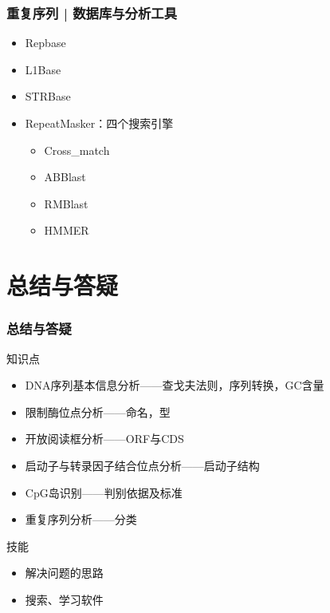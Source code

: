 \begin{frame}
	\frametitle{重复序列 | 数据库与分析工具}
	\begin{itemize}
		\item Repbase
		\item L1Base
		\item STRBase
		\item RepeatMasker：四个搜索引擎
			\begin{itemize}
				\item Cross\_match
				\item ABBlast
				\item RMBlast
				\item HMMER
			\end{itemize}
	\end{itemize}
\end{frame}

\section{总结与答疑}
\begin{frame}
	\frametitle{总结与答疑}
	\begin{block}{知识点}
		\begin{itemize}
			\item DNA序列基本信息分析——查戈夫法则，序列转换，GC含量
			\item 限制酶位点分析——命名，型
			\item 开放阅读框分析——ORF与CDS
			\item 启动子与转录因子结合位点分析——启动子结构
			\item CpG岛识别——判别依据及标准
			\item 重复序列分析——分类
		\end{itemize}
	\end{block}
	\begin{block}{技能}
		\begin{itemize}
			\item 解决问题的思路
			\item 搜索、学习软件
		\end{itemize}
	\end{block}
\end{frame}

